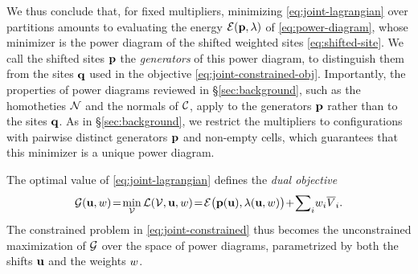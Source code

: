 \documentclass[main.tex]{subfiles}
\begin{document}
%
We thus conclude that, for fixed multipliers, minimizing \eqref{eq:joint-lagrangian} over partitions amounts to evaluating the energy $\mathcal{E}(\mathbf{p}, \lambda)$ of \eqref{eq:power-diagram}, whose minimizer is the power diagram of the shifted weighted sites \eqref{eq:shifted-site}.
%
We call the shifted sites $\mathbf{p}$ the \emph{generators} of this power diagram, to distinguish them from the sites $\mathbf{q}$ used in the objective \eqref{eq:joint-constrained-obj}.
Importantly, the properties of power diagrams reviewed in \S\ref{sec:background}, such as the homotheties $\mathcal{N}$ and the normals of $\mathcal{C}$, apply to the generators $\mathbf{p}$ rather than to the sites $\mathbf{q}$.
%
As in \S\ref{sec:background}, we restrict the multipliers to configurations with pairwise distinct generators $\mathbf{p}$ and non-empty cells, which guarantees that this minimizer is a unique power diagram.

The optimal value of \eqref{eq:joint-lagrangian} defines the \emph{dual objective}
\begin{equation}
  \mathcal{G}(\mathbf{u}, w)
    \!=\!
    \min_{\mathcal{V}} \mathcal{L}(\mathcal{V}, \mathbf{u}, w)
    \!=\!
    \mathcal{E}\bigl( \mathbf{p}(\mathbf{u}), \lambda(\mathbf{u}, w) \bigr) \!+\! \sum\nolimits_{i}\! w_i \overline{V}_i.
  \label{eq:joint-dual}
\end{equation}
The constrained problem in \eqref{eq:joint-constrained} thus becomes the {unconstrained} maximization of $\mathcal{G}$ over the space of power diagrams, parametrized by both the shifts $\mathbf{u}$ and the weights $w$.
\end{document}
